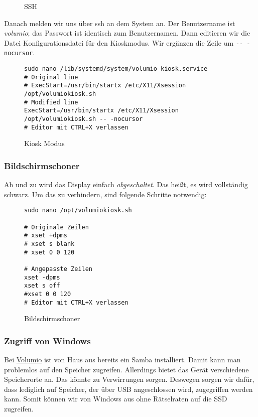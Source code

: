 \documentclass[12pt,a4paper]{article}
\newcommand{\code}[1]{\texttt{#1}}
\newcommand{\jpaimg}[2]{\begin{figure}[H]\centering\fbox{\texttt{[image: \#1]}}\caption{#2}\label{fig:#2}\end{figure}}
\newcommand{\vol}{\href{https://volumio.org/}{Volumio}}
\begin{document}
\jpaimg{./../images/vol-dev.png}{SSH}

\newpage
Danach melden wir uns über ssh an dem System an. Der Benutzername ist \textit{volumio}; das Passwort ist identisch zum Benutzernamen. Dann editieren wir die
Datei Konfigurationsdatei für den Kioskmodus. Wir ergänzen die Zeile um \code{-{}- -nocursor}.

\begin{figure}[H]
\begin{lstlisting}
sudo nano /lib/systemd/system/volumio-kiosk.service
# Original line
# ExecStart=/usr/bin/startx /etc/X11/Xsession /opt/volumiokiosk.sh
# Modified line
ExecStart=/usr/bin/startx /etc/X11/Xsession /opt/volumiokiosk.sh -- -nocursor
# Editor mit CTRL+X verlassen
\end{lstlisting}
\caption{Kiosk Modus}\label{fig:Kiosk Modus}
\end{figure}

\subsubsection{Bildschirmschoner}
Ab und zu wird das Display einfach \textit{abgeschaltet}. Das heißt, es wird vollständig schwarz. Um das zu verhindern, sind folgende Schritte notwendig:

\begin{figure}[H]
\begin{lstlisting}
sudo nano /opt/volumiokiosk.sh

# Originale Zeilen
# xset +dpms
# xset s blank
# xset 0 0 120

# Angepasste Zeilen
xset -dpms
xset s off
#xset 0 0 120
# Editor mit CTRL+X verlassen
\end{lstlisting}
\caption{Bildschirmschoner}\label{fig:Bildschirmschoner}
\end{figure}

\newpage
\subsubsection{Zugriff von Windows}
Bei \vol{} ist von Haus aus bereits ein Samba installiert. Damit kann man problemlos auf den Speicher zugreifen. Allerdings bietet das Gerät verschiedene
Speicherorte an. Das könnte zu Verwirrungen sorgen. Deswegen sorgen wir dafür, dass lediglich auf Speicher, der über USB angeschlossen wird, zugegriffen werden
kann. Somit können wir von Windows aus ohne Rätselraten auf die SSD zugreifen.
\end{document}
